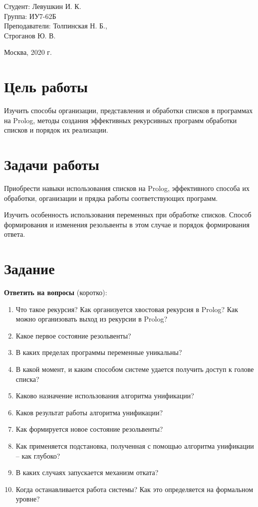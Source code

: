 \documentclass[a4paper,12pt]{article}
\begin{document}
\vspace*{15mm} 	

\large
\begin{flushright}
	Студент: Левушкин И. К. \\
	Группа: ИУ7-62Б \\
	Преподаватели: Толпинская Н. Б., \\ Строганов Ю. В. \\
\end{flushright}

\vspace*{30mm}
\begin{center}
	Москва, 2020 г.  
\end{center}
\thispagestyle{empty}


\newpage

\section*{Цель работы}

Изучить способы организации, представления и обработки списков в программах на Prolog, методы создания эффективных рекурсивных программ обработки списков и порядок их реализации.

\section*{Задачи работы}

Приобрести навыки использования списков на Prolog, эффективного способа их обработки, организации и прядка работы соответствующих программ.

Изучить особенность использования переменных при обработке списков. Способ формирования и изменения резольвенты в этом случае и порядок формирования ответа. 

\section*{Задание}

{\bf Ответить на вопросы} (коротко):
\begin{enumerate}
	\item Что такое рекурсия? Как организуется хвостовая рекурсия в Prolog? Как можно организовать выход из рекурсии в Prolog?
	\item Какое первое состояние резольвенты?
	\item В каких пределах программы переменные уникальны? 
	\item В какой момент, и каким способом системе удается получить доступ к голове списка?
	\item Каково назначение использования алгоритма унификации?
	\item Каков  результат работы алгоритма унификации? 
	\item Как формируется новое состояние резольвенты?
	\item Как применяется подстановка, полученная с помощью алгоритма унификации – как глубоко?
	\item В каких случаях запускается механизм отката? 
	\item Когда останавливается работа системы? Как это определяется на формальном уровне?
\end{enumerate}
\end{document}
